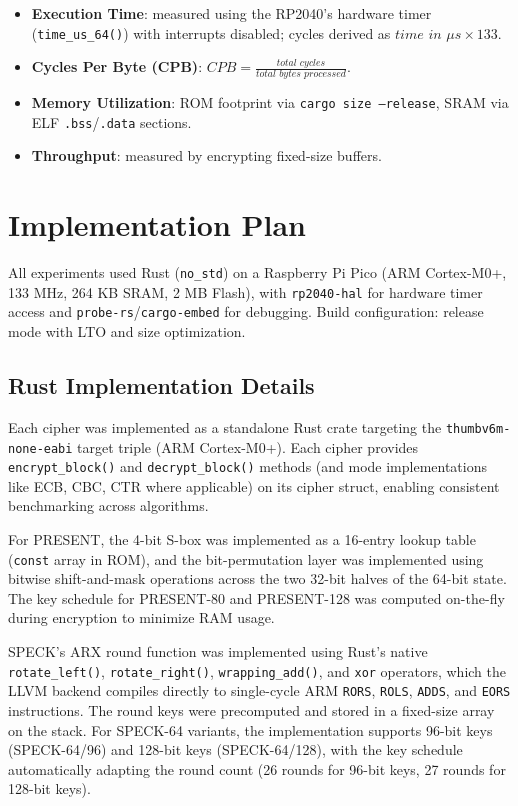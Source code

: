 \documentclass[12pt]{report}
\begin{document}
\begin{itemize}
    \item \textbf{Execution Time}: measured using the RP2040's hardware timer (\texttt{time\_us\_64()})
          with interrupts disabled; cycles derived as $\textit{time in }\mu s \times 133$.
    \item \textbf{Cycles Per Byte (CPB)}: $\textit{CPB} = \frac{\textit{total cycles}}{\textit{total bytes processed}}$.
    \item \textbf{Memory Utilization}: ROM footprint via \texttt{cargo size --release}, SRAM via ELF
          \texttt{.bss}/\texttt{.data} sections.
    \item \textbf{Throughput}: measured by encrypting fixed-size buffers.
\end{itemize}

\section{Implementation Plan}

All experiments used Rust (\texttt{no\_std}) on a Raspberry Pi Pico (ARM Cortex-M0+, 133 MHz,
264 KB SRAM, 2 MB Flash), with \texttt{rp2040-hal} for hardware timer access and
\texttt{probe-rs}/\texttt{cargo-embed} for debugging. Build configuration: release mode with LTO
and size optimization.

\subsection*{Rust Implementation Details}

Each cipher was implemented as a standalone Rust crate targeting the
\texttt{thumbv6m-none-eabi} target triple (ARM Cortex-M0+). Each cipher
provides \texttt{encrypt\_block()} and \texttt{decrypt\_block()} methods
(and mode implementations like ECB, CBC, CTR where applicable) on its
cipher struct, enabling consistent benchmarking across algorithms.

For PRESENT, the 4-bit S-box was implemented as a 16-entry lookup table
(\texttt{const} array in ROM), and the bit-permutation layer was
implemented using bitwise shift-and-mask operations across the two
32-bit halves of the 64-bit state. The key schedule for PRESENT-80
and PRESENT-128 was computed on-the-fly during encryption to minimize
RAM usage.

SPECK's ARX round function was implemented using Rust's native
\texttt{rotate\_left()}, \texttt{rotate\_right()}, \texttt{wrapping\_add()},
and \texttt{xor} operators, which the LLVM backend compiles directly to
single-cycle ARM \texttt{RORS}, \texttt{ROLS}, \texttt{ADDS}, and
\texttt{EORS} instructions. The round keys were precomputed and stored
in a fixed-size array on the stack. For SPECK-64 variants, the implementation supports 96-bit keys (SPECK-64/96) and 128-bit keys (SPECK-64/128), with the key schedule automatically adapting the round count (26 rounds for 96-bit keys, 27 rounds for 128-bit keys).
\end{document}
